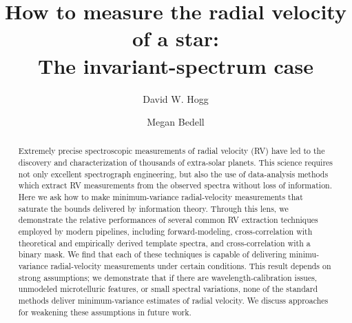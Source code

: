 \documentclass[modern]{aastex631}
\newcommand{\acronym}[1]{\textsc{#1}}
\newcommand{\RV}{\acronym{RV}}
\begin{document}
\title{How to measure the radial velocity of a star:\\The invariant-spectrum case}
\author[0000-0003-2866-9403]{David W. Hogg}

\author[0000-0001-9907-7742]{Megan Bedell}

\begin{abstract}\noindent
    Extremely precise spectroscopic measurements of radial velocity (\RV) have led to the discovery and characterization of thousands of extra-solar planets.
    This science requires not only excellent spectrograph engineering, but also the use of data-analysis methods which extract RV measurements from the observed spectra without loss of information. 
    Here we ask how to make minimum-variance radial-velocity measurements that saturate the bounds delivered by information theory. 
    Through this lens, we demonstrate the relative performances of several common RV extraction techniques employed by modern pipelines, including forward-modeling, cross-correlation with theoretical and empirically derived template spectra, and cross-correlation with a binary mask. 
    We find that each of these techniques is capable of delivering minimu-variance radial-velocity measurements under certain conditions. 
    This result depends on strong assumptions; we demonstrate that if there are wavelength-calibration issues, unmodeled microtelluric features, or small spectral variations, none of the standard methods deliver minimum-variance estimates of radial velocity. 
    We discuss approaches for weakening these assumptions in future work.
\end{abstract}
\end{document}
